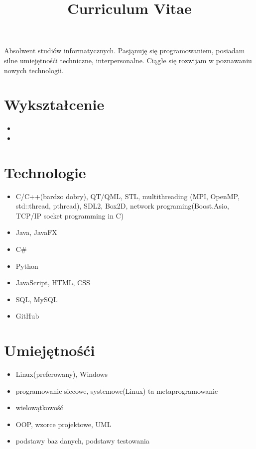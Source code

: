 \documentclass[12pt,a4paper,sans]{moderncv}
\title{Curriculum Vitae}
\begin{document}
\makecvtitle
\small{Absolwent studiów informatycznych. Pasjąnuję się programowaniem, posiadam silne umiejętnośći techniczne, interpersonalne. Ciągłe się rozwijam w poznawaniu nowych technologii.}

\section{Wykształcenie}

\begin{itemize}
\item{}
\item{}

\end{itemize}

\section{Technologie}
\begin{itemize}

\item{C/C++(bardzo dobry), QT/QML, STL, multithreading (MPI, OpenMP, std::thread, pthread), SDL2, Box2D, network programing(Boost.Asio, TCP/IP socket programming in C)}
\item{Java, JavaFX}
\item{C\#}
\item{Python}
\item{JavaScript, HTML, CSS}
\item{SQL, MySQL}
\item{GitHub}
\end{itemize}

\section{Umiejętnośći}
\begin{itemize}
\item{Linux(preferowany), Windows}
\item{programowanie siecowe, systemowe(Linux) ta metaprogramowanie}
\item{wielowątkowość}
\item{OOP, wzorce projektowe, UML}
\item{podstawy baz danych, podstawy testowania}
\end{itemize}
\end{document}
